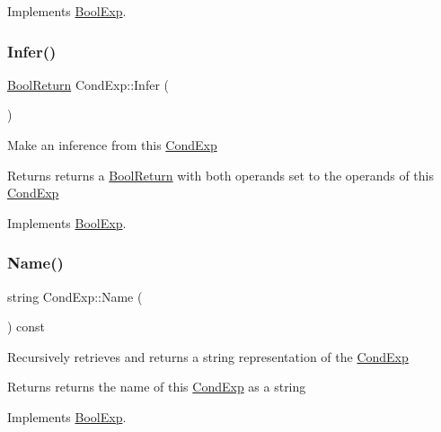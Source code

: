 Implements \mbox{\hyperlink{classBoolExp_a591fb5f9cb849e0f56e596406a9a10d0}{Bool\+Exp}}.

\mbox{\label{classCondExp_a3824041035f12f58e583181b57491668}} 
\subsubsection{\texorpdfstring{Infer()}{Infer()}}
{\footnotesize\ttfamily \mbox{\hyperlink{structBoolReturn}{Bool\+Return}} Cond\+Exp\+::\+Infer (\begin{DoxyParamCaption}{ }\end{DoxyParamCaption})\hspace{0.3cm}{\ttfamily [virtual]}}

Make an inference from this \mbox{\hyperlink{classCondExp}{Cond\+Exp}} \begin{DoxyReturn}{Returns}
returns a \mbox{\hyperlink{structBoolReturn}{Bool\+Return}} with both operands set to the operands of this \mbox{\hyperlink{classCondExp}{Cond\+Exp}} 
\end{DoxyReturn}


Implements \mbox{\hyperlink{classBoolExp_a0e5d4a241332ae72d083645e4b71e0e6}{Bool\+Exp}}.

\mbox{\label{classCondExp_a556da724a343a45e1bab5da0a3f8a091}} 
\subsubsection{\texorpdfstring{Name()}{Name()}}
{\footnotesize\ttfamily string Cond\+Exp\+::\+Name (\begin{DoxyParamCaption}{ }\end{DoxyParamCaption}) const\hspace{0.3cm}{\ttfamily [virtual]}}

Recursively retrieves and returns a string representation of the \mbox{\hyperlink{classCondExp}{Cond\+Exp}} \begin{DoxyReturn}{Returns}
returns the name of this \mbox{\hyperlink{classCondExp}{Cond\+Exp}} as a string 
\end{DoxyReturn}


Implements \mbox{\hyperlink{classBoolExp_a3fdb64a9b8fd54e33d755ff4a577d11a}{Bool\+Exp}}.

